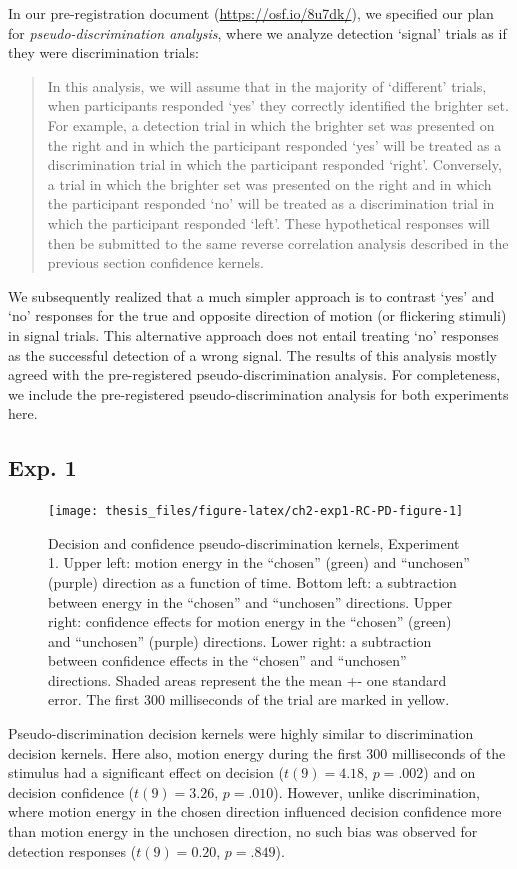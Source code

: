 \documentclass[12pt,twoside]{reedthesis}
\begin{document}
In our pre-registration document (\url{https://osf.io/8u7dk/}), we specified our plan for \emph{pseudo-discrimination analysis}, where we analyze detection `signal' trials as if they were discrimination trials:
\begin{quote}
In this analysis, we will assume that in the majority of `different' trials, when participants responded `yes' they correctly identified the brighter set. For example, a detection trial in which the brighter set was presented on the right and in which the participant responded `yes' will be treated as a discrimination trial in which the participant responded `right'. Conversely, a trial in which the brighter set was presented on the right and in which the participant responded `no' will be treated as a discrimination trial in which the participant responded `left'. These hypothetical responses will then be submitted to the same reverse correlation analysis described in the previous section confidence kernels.
\end{quote}
We subsequently realized that a much simpler approach is to contrast `yes' and `no' responses for the true and opposite direction of motion (or flickering stimuli) in signal trials. This alternative approach does not entail treating `no' responses as the successful detection of a wrong signal. The results of this analysis mostly agreed with the pre-registered pseudo-discrimination analysis. For completeness, we include the pre-registered pseudo-discrimination analysis for both experiments here.



\hypertarget{exp.-1}{%
\subsection{Exp. 1}\label{exp.-1}}
\begin{figure}
\texttt{[image: thesis\_files/figure-latex/ch2-exp1-RC-PD-figure-1]} \caption[Pseudo-discrimination kernels for detection signal trials.]{Decision and confidence pseudo-discrimination kernels, Experiment 1. Upper left: motion energy in the ``chosen'' (green) and ``unchosen'' (purple) direction as a function of time. Bottom left: a subtraction between energy in the ``chosen'' and ``unchosen'' directions. Upper right: confidence effects for motion energy in the ``chosen'' (green) and ``unchosen'' (purple) directions. Lower right: a subtraction between confidence effects in the ``chosen'' and ``unchosen'' directions. Shaded areas represent the the mean +- one standard error. The first 300 milliseconds of the trial are marked in yellow.}\label{fig:ch2-exp1-RC-PD-figure}
\end{figure}
Pseudo-discrimination decision kernels were highly similar to discrimination decision kernels. Here also, motion energy during the first 300 milliseconds of the stimulus had a significant effect on decision (\(t(9) = 4.18\), \(p = .002\)) and on decision confidence (\(t(9) = 3.26\), \(p = .010\)). However, unlike discrimination, where motion energy in the chosen direction influenced decision confidence more than motion energy in the unchosen direction, no such bias was observed for detection responses (\(t(9) = 0.20\), \(p = .849\)).
\end{document}
